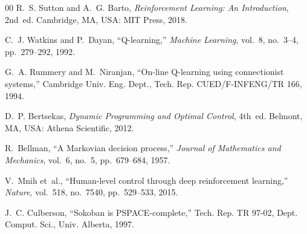 \documentclass[10pt,conference]{IEEEtran}
\begin{document}
\begin{thebibliography}{00}
R.~S. Sutton and A.~G. Barto, \emph{Reinforcement Learning: An Introduction}, 2nd~ed. Cambridge, MA, USA: MIT Press, 2018.

C.~J. Watkins and P.~Dayan, ``Q-learning,'' \emph{Machine Learning}, vol.~8, no.~3--4, pp.~279--292, 1992.

G.~A. Rummery and M.~Niranjan, ``On-line Q-learning using connectionist systems,'' Cambridge Univ. Eng. Dept., Tech. Rep. CUED/F-INFENG/TR 166, 1994.

D.~P. Bertsekas, \emph{Dynamic Programming and Optimal Control}, 4th~ed. Belmont, MA, USA: Athena Scientific, 2012.

R.~Bellman, ``A Markovian decision process,'' \emph{Journal of Mathematics and Mechanics}, vol.~6, no.~5, pp.~679--684, 1957.

V.~Mnih et~al., ``Human-level control through deep reinforcement learning,'' \emph{Nature}, vol.~518, no.~7540, pp.~529--533, 2015.

J.~C. Culberson, ``Sokoban is PSPACE-complete,'' Tech. Rep. TR 97-02, Dept. Comput. Sci., Univ. Alberta, 1997.
\end{thebibliography}
\end{document}
